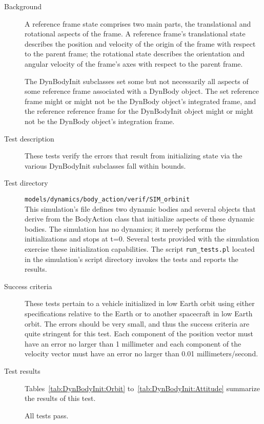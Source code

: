 \label{test:state_init}
\begin{description}
\item[Background]
A reference frame state comprises two main parts, the translational and
rotational aspects of the frame. A reference frame's translational state
describes the position and velocity of the origin of the frame with respect
to the parent frame; the rotational state describes the orientation and
angular velocity of the frame's axes with respect to the parent frame.

The DynBodyInit subclasses set some but not necessarily all aspects of some
reference frame associated with a DynBody object. The set reference frame
might or might not be the DynBody object's integrated frame, and the
reference reference frame for the DynBodyInit object might or might not
be the DynBody object's integration frame.

\item[Test description]
These tests verify the errors that result from initializing state
via the various DynBodyInit subclasses fall within bounds.

\item[Test directory] {\tt models/dynamics/body\_action/verif/SIM\_orbinit} \\
This simulation's \Sdefine file defines two dynamic bodies and several
objects that derive from the BodyAction class that initialize aspects
of these dynamic bodies. The simulation has no dynamics; it merely
performs the initializations and stops at t=0.
Several tests provided with the simulation exercise these initialization
capabilities. The script \verb+run_tests.pl+ located in the simulation's
script directory invokes the tests and reports the results.

\item[Success criteria]
These tests pertain to a vehicle initialized in low Earth orbit
using either specifications relative to the Earth or to another
spacecraft in low Earth orbit. The errors should be very small,
and thus the success criteria are quite stringent for this test.
Each component of the position vector
must have an error no larger than 1 millimeter
and each component of the velocity vector
must have an error no larger than 0.01 millimeters/second.

\item[Test results]
Tables~\ref{tab:DynBodyInit:Orbit} to~\ref{tab:DynBodyInit:Attitude}
summarize the results of this test.

All tests pass.


\end{description}
